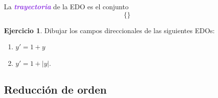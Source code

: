 \documentclass{article}
\theoremstyle{definition}
\newtheorem{exercise}{Ejercicio}
\theoremstyle{remark}
\numberwithin{equation}{section}
\newcommand{\wea}[1]{\textcolor{BlueViolet}{\textbf{\emph{#1}}}}
\begin{document}
La \wea{trayectoria} de la EDO es el conjunto
\[ \{\} \] %

\begin{exercise}
    Dibujar los campos direccionales de las siguientes EDOs:
    \begin{enumerate}
        \item $y' = 1+y$
        \item $y' = 1 + |y|$.
    \end{enumerate}
\end{exercise}

\subsection{Reducción de orden}
\end{document}
